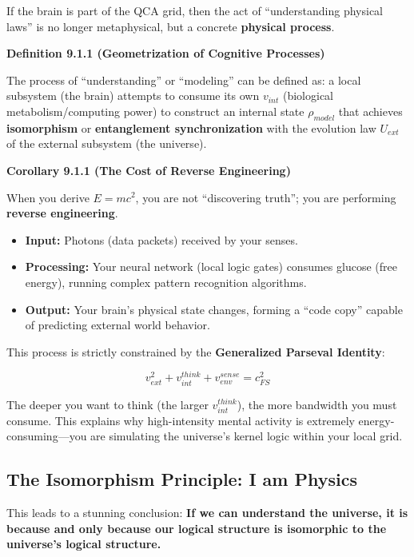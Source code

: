 \documentclass[11pt,a4paper,twoside]{book}
\begin{document}
If the brain is part of the QCA grid, then the act of ``understanding physical laws'' is no longer metaphysical, but a concrete \textbf{physical process}.

\textbf{Definition 9.1.1 (Geometrization of Cognitive Processes)}

The process of ``understanding'' or ``modeling'' can be defined as: a local subsystem (the brain) attempts to consume its own \textbf{$v_{int}$} (biological metabolism/computing power) to construct an internal state \textbf{$\rho_{model}$} that achieves \textbf{isomorphism} or \textbf{entanglement synchronization} with the evolution law \textbf{$U_{ext}$} of the external subsystem (the universe).

\textbf{Corollary 9.1.1 (The Cost of Reverse Engineering)}

When you derive $E=mc^2$, you are not ``discovering truth''; you are performing \textbf{reverse engineering}.

\begin{itemize}
\item \textbf{Input:} Photons (data packets) received by your senses.

\item \textbf{Processing:} Your neural network (local logic gates) consumes glucose (free energy), running complex pattern recognition algorithms.

\item \textbf{Output:} Your brain's physical state changes, forming a ``code copy'' capable of predicting external world behavior.
\end{itemize}

This process is strictly constrained by the \textbf{Generalized Parseval Identity}:

$$v_{ext}^2 + v_{int}^{think} + v_{env}^{sense} = c_{FS}^2$$

The deeper you want to think (the larger $v_{int}^{think}$), the more bandwidth you must consume. This explains why high-intensity mental activity is extremely energy-consuming---you are simulating the universe's kernel logic within your local grid.

\subsection{The Isomorphism Principle: I am Physics}

This leads to a stunning conclusion: \textbf{If we can understand the universe, it is because and only because our logical structure is isomorphic to the universe's logical structure.}
\end{document}
